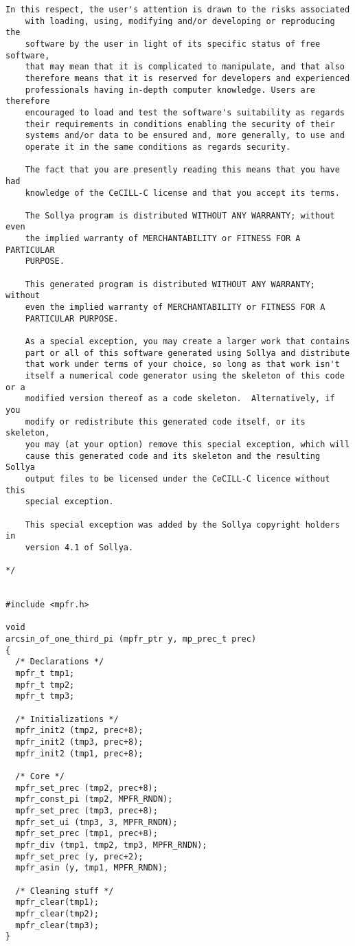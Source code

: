 \begin{center}
\begin{minipage}{15cm}
\begin{Verbatim}[frame=single]
    In this respect, the user's attention is drawn to the risks associated
    with loading, using, modifying and/or developing or reproducing the
    software by the user in light of its specific status of free software,
    that may mean that it is complicated to manipulate, and that also
    therefore means that it is reserved for developers and experienced
    professionals having in-depth computer knowledge. Users are therefore
    encouraged to load and test the software's suitability as regards
    their requirements in conditions enabling the security of their
    systems and/or data to be ensured and, more generally, to use and
    operate it in the same conditions as regards security.
    
    The fact that you are presently reading this means that you have had
    knowledge of the CeCILL-C license and that you accept its terms.
    
    The Sollya program is distributed WITHOUT ANY WARRANTY; without even
    the implied warranty of MERCHANTABILITY or FITNESS FOR A PARTICULAR
    PURPOSE.
    
    This generated program is distributed WITHOUT ANY WARRANTY; without
    even the implied warranty of MERCHANTABILITY or FITNESS FOR A
    PARTICULAR PURPOSE.
    
    As a special exception, you may create a larger work that contains
    part or all of this software generated using Sollya and distribute
    that work under terms of your choice, so long as that work isn't
    itself a numerical code generator using the skeleton of this code or a
    modified version thereof as a code skeleton.  Alternatively, if you
    modify or redistribute this generated code itself, or its skeleton,
    you may (at your option) remove this special exception, which will
    cause this generated code and its skeleton and the resulting Sollya
    output files to be licensed under the CeCILL-C licence without this
    special exception.
    
    This special exception was added by the Sollya copyright holders in
    version 4.1 of Sollya.
    
*/


#include <mpfr.h>

void
arcsin_of_one_third_pi (mpfr_ptr y, mp_prec_t prec)
{
  /* Declarations */
  mpfr_t tmp1;
  mpfr_t tmp2;
  mpfr_t tmp3;

  /* Initializations */
  mpfr_init2 (tmp2, prec+8);
  mpfr_init2 (tmp3, prec+8);
  mpfr_init2 (tmp1, prec+8);

  /* Core */
  mpfr_set_prec (tmp2, prec+8);
  mpfr_const_pi (tmp2, MPFR_RNDN);
  mpfr_set_prec (tmp3, prec+8);
  mpfr_set_ui (tmp3, 3, MPFR_RNDN);
  mpfr_set_prec (tmp1, prec+8);
  mpfr_div (tmp1, tmp2, tmp3, MPFR_RNDN);
  mpfr_set_prec (y, prec+2);
  mpfr_asin (y, tmp1, MPFR_RNDN);

  /* Cleaning stuff */
  mpfr_clear(tmp1);
  mpfr_clear(tmp2);
  mpfr_clear(tmp3);
}
\end{Verbatim}
\end{minipage}\end{center}
